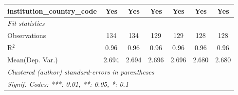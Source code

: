 \begin{tabular}{lcccccc}
   institution\_country\_code         & Yes        & Yes         & Yes        & Yes         & Yes        & Yes\\  
   \midrule
   \emph{Fit statistics}\\
   Observations                       & 134        & 134         & 129        & 129         & 128        & 128\\  
   R$^2$                              & 0.96       & 0.96        & 0.96       & 0.96        & 0.96       & 0.96\\  
Mean(Dep. Var.) & 2.694 & 2.694 & 2.696 & 2.696 & 2.680 & 2.680 \\
   \midrule \midrule
   \multicolumn{7}{l}{\emph{Clustered (author) standard-errors in parentheses}}\\
   \multicolumn{7}{l}{\emph{Signif. Codes: ***: 0.01, **: 0.05, *: 0.1}}\\
\end{tabular}
\par\endgroup

